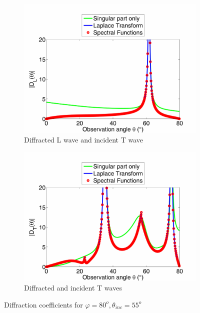 \begin{figure}
\begin{subfigure}[b]{0.49\textwidth}
        \includegraphics[width=\textwidth]{images/chapter3/Figure8c.pdf}
        \caption{Diffracted L wave and incident T wave}
        \label{8055TL}
    \end{subfigure}
    \begin{subfigure}[b]{0.49\textwidth}
        \includegraphics[width=\textwidth]{images/chapter3/Figure8d.pdf}
        \caption{Diffracted and incident T waves}
        \label{8055TT}
     \end{subfigure}
     \caption{Diffraction coefficients for $\varphi=80^o, \theta_{inc}=55^o$}
     \label{8055}
\end{figure}

